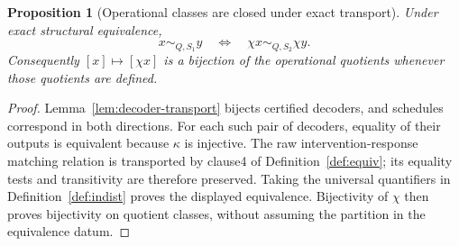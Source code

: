 \documentclass[11pt,a4paper]{article}
\newtheorem{proposition}[theorem]{Proposition}
\theoremstyle{definition}
\begin{document}
\begin{proposition}[Operational classes are closed under exact transport]\label{prop:transport}
Under exact structural equivalence,
\[
 x\sim_{Q,S_1}y\quad\Longleftrightarrow\quad\chi x\sim_{Q,S_2}\chi y.
\]
Consequently $[x]\mapsto[\chi x]$ is a bijection of the operational quotients whenever those quotients are defined.
\end{proposition}
\begin{proof}
Lemma~\ref{lem:decoder-transport} bijects certified decoders, and schedules correspond in both directions. For each such pair of decoders, equality of their outputs is equivalent because $\kappa$ is injective. The raw intervention-response matching relation is transported by clause4 of Definition~\ref{def:equiv}; its equality tests and transitivity are therefore preserved. Taking the universal quantifiers in Definition~\ref{def:indist} proves the displayed equivalence. Bijectivity of $\chi$ then proves bijectivity on quotient classes, without assuming the partition in the equivalence datum.
\end{proof}
\end{document}
